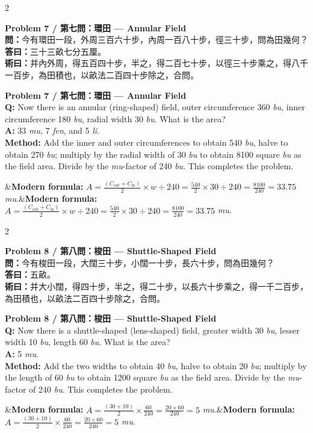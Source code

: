 \documentclass[11pt,a4paper]{article}
\newcommand{\bilingualproblem}[4]{%
  \begin{paracol}{2}
  \begin{leftcolumn}
  \noindent\textbf{\color{problemcolor}#1}\\[0.2cm]
  #2
  \end{leftcolumn}
  \switchcolumn
  \noindent\textbf{\color{problemcolor}#1}\\[0.2cm]
  #3
  \end{paracol}
  \ifx&#4&\else\vspace{0.3cm}\noindent#4\fi
  \vspace{0.5cm}
}
\newcommand{\wen}[1]{\textcolor{problemcolor}{\textbf{問：}}#1}
\newcommand{\da}[1]{\textcolor{answercolor}{\textbf{答曰：}}#1}
\newcommand{\shu}[1]{\textcolor{methodcolor}{\textbf{術曰：}}#1}
\newcommand{\wenen}[1]{\textcolor{problemcolor}{\textbf{Q:}} #1}
\newcommand{\daen}[1]{\textcolor{answercolor}{\textbf{A:}} #1}
\newcommand{\shuen}[1]{\textcolor{methodcolor}{\textbf{Method:}} #1}
\begin{document}
\bilingualproblem{Problem 7 / 第七問：環田 --- Annular Field}{
\wen{今有環田一段，外周三百六十步，內周一百八十步，徑三十步，問為田幾何？}\\[0.2cm]
\da{三十三畝七分五厘。}\\[0.2cm]
\shu{并內外周，得五百四十步，半之，得二百七十步，以徑三十步乘之，得八千一百步，為田積也，以畝法二百四十步除之，合問。}
}{
\wenen{Now there is an annular (ring-shaped) field, outer circumference 360 \textit{bu}, inner circumference 180 \textit{bu}, radial width 30 \textit{bu}. What is the area?}\\[0.2cm]
\daen{33 \textit{mu}, 7 \textit{fen}, and 5 \textit{li}.}\\[0.2cm]
\shuen{Add the inner and outer circumferences to obtain 540 \textit{bu}, halve to obtain 270 \textit{bu}; multiply by the radial width of 30 \textit{bu} to obtain 8100 square \textit{bu} as the field area. Divide by the \textit{mu}-factor of 240 \textit{bu}. This completes the problem.}
}{\textbf{Modern formula:} $A = \frac{(C_{\text{out}} + C_{\text{in}})}{2} \times w \div 240 = \frac{540}{2} \times 30 \div 240 = \frac{8100}{240} = 33.75$ \textit{mu}.}

\newpage

\bilingualproblem{Problem 8 / 第八問：梭田 --- Shuttle-Shaped Field}{
\wen{今有梭田一段，大闊三十步，小闊一十步，長六十步，問為田幾何？}\\[0.2cm]
\da{五畝。}\\[0.2cm]
\shu{并大小闊，得四十步，半之，得二十步，以長六十步乘之，得一千二百步，為田積也，以畝法二百四十步除之，合問。}
}{
\wenen{Now there is a shuttle-shaped (lens-shaped) field, greater width 30 \textit{bu}, lesser width 10 \textit{bu}, length 60 \textit{bu}. What is the area?}\\[0.2cm]
\daen{5 \textit{mu}.}\\[0.2cm]
\shuen{Add the two widths to obtain 40 \textit{bu}, halve to obtain 20 \textit{bu}; multiply by the length of 60 \textit{bu} to obtain 1200 square \textit{bu} as the field area. Divide by the \textit{mu}-factor of 240 \textit{bu}. This completes the problem.}
}{\textbf{Modern formula:} $A = \frac{(30+10)}{2} \times \frac{60}{240} = \frac{20 \times 60}{240} = 5$ \textit{mu}.}
\end{document}
